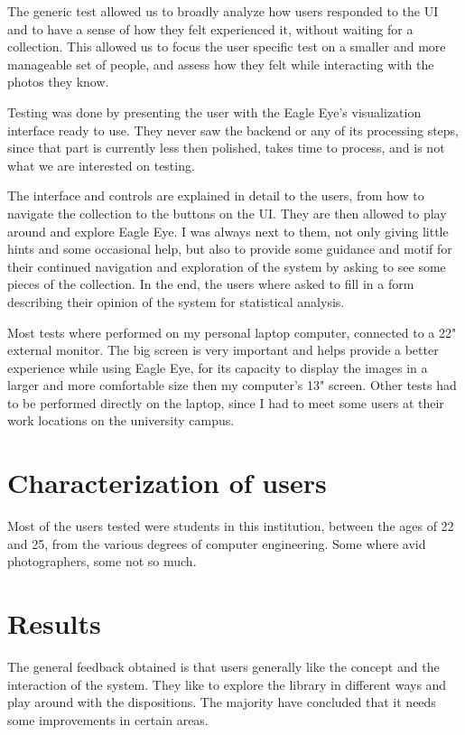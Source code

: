 The generic test allowed us to broadly analyze how users responded to the \ac{UI} and to have a sense of how they felt experienced it, without waiting for a collection. This allowed us to focus the user specific test on a smaller and more manageable set of people, and assess how they felt while interacting with the photos they know.

Testing was done by presenting the user with the Eagle Eye's visualization interface ready to use. They never saw the backend or any of its processing steps, since that part is currently less then polished, takes time to process, and is not what we are interested on testing.

The interface and controls are explained in detail to the users, from how to navigate the collection to the buttons on the \ac{UI}. They are then allowed to play around and explore Eagle Eye. I was always next to them, not only giving little hints and some occasional help, but also to provide some guidance and motif for their continued navigation and exploration of the system by asking to see some pieces of the collection. In the end, the users where asked to fill in a form describing their opinion of the system for statistical analysis.

Most tests where performed on my personal laptop computer, connected to a 22" external monitor. The big screen is very important and helps provide a better experience while using Eagle Eye, for its capacity to display the images in a larger and more comfortable size then my computer's 13" screen. Other tests had to be performed directly on the laptop, since I had to meet some users at their work locations on the university campus.




\section{Characterization of users}

Most of the users tested were students in this institution, between the ages of 22 and 25, from the various degrees of computer engineering. Some where avid photographers, some not so much.

\section{Results}

The general feedback obtained is that users generally like the concept and the interaction of the system. They like to explore the library in different ways and play around with the dispositions. The majority have concluded that it needs some improvements in certain areas.

